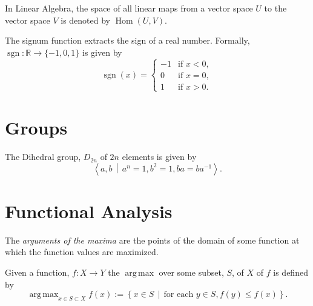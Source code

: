 \documentclass[a4paper,11pt]{article}
\newcommand{\R}{\mathbb{R}}
\newcommand{\presentation}[2]{\left\langle #1 \, \middle| \, #2 \right\rangle}
\DeclareMathOperator{\Hom}{Hom}
\DeclareMathOperator{\sgn}{sgn}
\DeclareMathOperator*{\argmax}{arg \, max}
\begin{document}
In Linear Algebra, the space of all linear maps from a vector space $U$ to the vector space $V$ is denoted by $\Hom(U,V)$.

The signum function extracts the sign of a real number. Formally, $\sgn \colon \R \to \{-1, 0, 1\}$ is given by
\[
\sgn(x) =
\begin{cases}
	-1 	& \text{if } x < 0, \\
	0 	& \text{if } x = 0, \\
	1 	& \text{if } x > 0.
\end{cases}
\]

\section{Groups}

The Dihedral group, $D_{2n}$ of $2n$ elements is given by 
\[
\presentation{a,b}{a^n=1, b^2=1, ba=ba^{-1}}.
\]

\section{Functional Analysis}

The \emph{arguments of the maxima} are the points of the domain of some function at which the function values are maximized.

Given a function, $f \colon X \to Y$ the $\argmax$ over some subset, $S$, of $X$ of $f$ is defined by
\[
\argmax_{x \in S \subset X}
f(x) := \left\{ x  \in S \, \middle| \, \text{for each } y \in S, f(y) \leq f(x)\right\} .
\]
\end{document}
